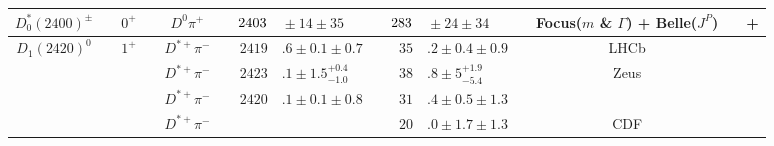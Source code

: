 \begin{adjustbox}{width=0.76\textwidth,center}
{\begin{tabular}{cp{5pt}cp{5pt}cp{5pt}r@{}lp{5pt}r@{}lp{5pt}cp{5pt}c}
		\multirow{1}{*}{$D_{0}^{*}(2400)^{\pm}$} &                  & \multirow{1}{*}{$0^{+}$}     &                  & $D^{0}\pi^{+}$                  & \cellcolor{LightGray} & $	\cellcolor{LightGray}2403$  & \cellcolor{LightGray}${} \pm 14 \pm35	$       & \cellcolor{LightGray} & $	\cellcolor{LightGray}283$                      & \cellcolor{LightGray}${} \pm24 \pm34	$       & \cellcolor{LightGray} & \cellcolor{LightGray} Focus($m$ \& $\Gamma$) + Belle($J^{P}$) & \cellcolor{LightGray} & \cite{Link:2003bd} + \cite{Kuzmin:2006mw} \\ \midrule
		\multirow{11}{*}{$D_{1}^{}(2420)^{0}$}   &                  & \multirow{11}{*}{$1^{+}$}    &                  & $D^{*+}\pi^{-}$                 &                       & $	2419$                       & $.6\pm0.1\pm0.7	$                             &                       & $	35$                                            & $.2\pm0.4\pm0.9	$                            &                       & LHCb                                                          &                       & \cite{Aaij:2013sza}                       \\
		                                         &                  &                              &                  & $D^{*+}\pi^{-}$                 &                       & $	2423$                       & $.1 \pm 1.5 ^{+0.4}_{-1.0}	$                  &                       & $	38$                                            & $.8\pm5^{+1.9}_{-5.4}	$                      &                       & Zeus                                                          &                       & \cite{Abramowicz:2012ys}                  \\
		                                         &                  &                              &                  & $D^{*+}\pi^{-}$                 &                       & $	2420$                       & $.1 \pm0.1 \pm0.8	$                           &                       & $	31$                                            & $.4\pm0.5\pm1.3	$                            &                       & \babar{}                                                      &                       & \cite{delAmoSanchez:2010vq}               \\
		                                         &                  &                              &                  & $D^{*+}\pi^{-}$                 &                       & $		$                          &                                               &                       & $	20$                                            & $.0\pm1.7\pm1.3	$                            &                       & CDF                                                           &                       & \cite{Abulencia:2005ry}                   \\

\end{tabular}}
\end{adjustbox}
